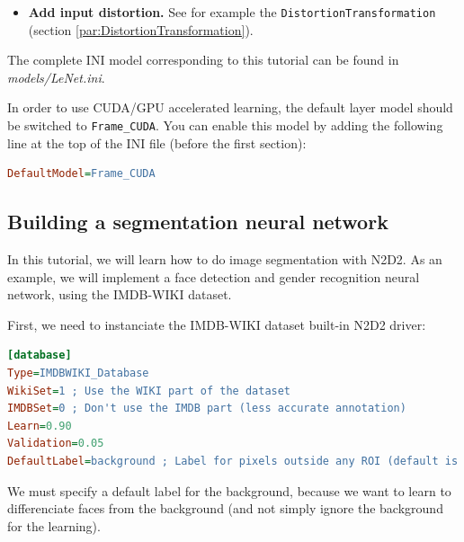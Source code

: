 \documentclass[a4paper,11pt,oneside]{article}
\newenvironment{myitemize}
{ \begin{itemize}
    \setlength{\itemsep}{0pt}
    \setlength{\parskip}{0pt}
    \setlength{\parsep}{0pt}     }
{ \end{itemize}                  }
\begin{document}
\begin{myitemize}
\begin{lstlisting}[language=ini]
[conv1]
...
ConfigSection=common.config

[...]
...

[common.config]
NoBias=1
WeightsSolver.LearningRate=0.05
WeightsSolver.Decay=0.0005
Solvers.LearningRatePolicy=StepDecay
Solvers.LearningRateStepSize=[sp]_EpochSize
Solvers.LearningRateDecay=0.993
Solvers.Clamping=1
\end{lstlisting}

For more details on the configuration parameters for the \lstinline!Solver!, see
section \ref{sec:WeightSolvers}.

\item \textbf{Add input distortion.} See for example the
\lstinline!DistortionTransformation! (section
\ref{par:DistortionTransformation}).
\end{myitemize}

The complete INI model corresponding to this tutorial can be found in
\emph{models/LeNet.ini}.

In order to use CUDA/GPU accelerated learning, the default layer model should be
switched to \lstinline!Frame_CUDA!. You can enable this model by adding the
following line at the top of the INI file (before the first section):
\begin{lstlisting}[language=ini]
DefaultModel=Frame_CUDA
\end{lstlisting}

\subsection{Building a segmentation neural network}

In this tutorial, we will learn how to do image segmentation with N2D2. As an
example, we will implement a face detection and gender recognition neural
network, using the IMDB-WIKI dataset.

First, we need to instanciate the IMDB-WIKI dataset built-in N2D2 driver:

\begin{lstlisting}[language=ini]
[database]
Type=IMDBWIKI_Database
WikiSet=1 ; Use the WIKI part of the dataset
IMDBSet=0 ; Don't use the IMDB part (less accurate annotation)
Learn=0.90
Validation=0.05
DefaultLabel=background ; Label for pixels outside any ROI (default is no label, pixels are ignored)
\end{lstlisting}

We must specify a default label for the background, because we want to learn to
differenciate faces from the background (and not simply ignore the background
for the learning).
\end{document}
